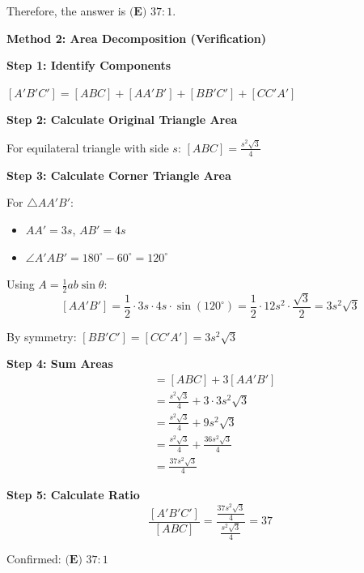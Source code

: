 \documentclass[11pt]{article}
\begin{document}
\begin{solutionbox}
Therefore, the answer is $\boxed{\textbf{(E) } 37:1}$.

\vspace{0.5cm}

\textbf{Method 2: Area Decomposition (Verification)}

\textbf{Step 1: Identify Components}

$[A'B'C'] = [ABC] + [AA'B'] + [BB'C'] + [CC'A']$

\textbf{Step 2: Calculate Original Triangle Area}

For equilateral triangle with side $s$: $[ABC] = \frac{s^2\sqrt{3}}{4}$

\textbf{Step 3: Calculate Corner Triangle Area}

For $\triangle AA'B'$:
\begin{itemize}
    \item $AA' = 3s$, $AB' = 4s$
    \item $\angle A'AB' = 180^{\circ} - 60^{\circ} = 120^{\circ}$
\end{itemize}

Using $A = \frac{1}{2}ab\sin\theta$:
\[[AA'B'] = \frac{1}{2} \cdot 3s \cdot 4s \cdot \sin(120^{\circ}) = \frac{1}{2} \cdot 12s^2 \cdot \frac{\sqrt{3}}{2} = 3s^2\sqrt{3}\]

By symmetry: $[BB'C'] = [CC'A'] = 3s^2\sqrt{3}$

\textbf{Step 4: Sum Areas}
\begin{align*}
    [A'B'C'] &= [ABC] + 3[AA'B'] \\
    &= \frac{s^2\sqrt{3}}{4} + 3 \cdot 3s^2\sqrt{3} \\
    &= \frac{s^2\sqrt{3}}{4} + 9s^2\sqrt{3} \\
    &= \frac{s^2\sqrt{3}}{4} + \frac{36s^2\sqrt{3}}{4} \\
    &= \frac{37s^2\sqrt{3}}{4}
\end{align*}

\textbf{Step 5: Calculate Ratio}
\[\frac{[A'B'C']}{[ABC]} = \frac{\frac{37s^2\sqrt{3}}{4}}{\frac{s^2\sqrt{3}}{4}} = 37\]

Confirmed: $\boxed{\textbf{(E) } 37:1}$
\end{solutionbox}
\end{document}
